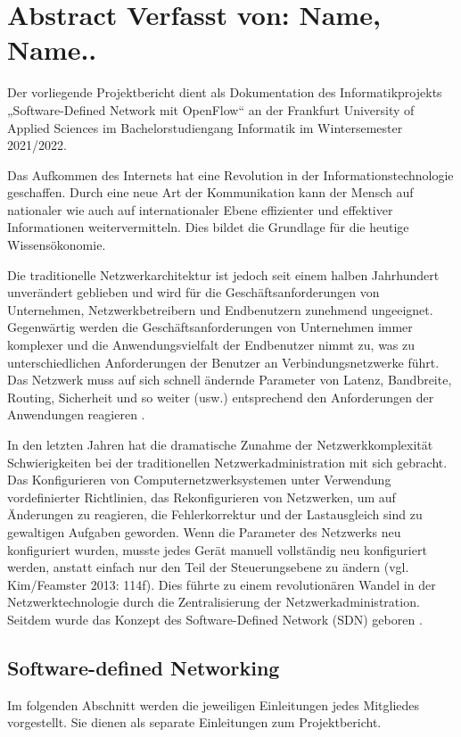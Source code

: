 \documentclass[fontsize=12pt,paper=a4,open=any,parskip=half,
  twoside=false,toc=listof,toc=bibliography,fleqn,leqno,
  captions=nooneline,captions=tableabove,british]{scrbook}
\begin{document}
\chapter{Abstract \tiny Verfasst von: Name, Name..}
Der vorliegende Projektbericht dient als Dokumentation des Informatikprojekts „Software-Defined Network mit OpenFlow“ an der Frankfurt University of Applied Sciences im Bachelorstudiengang Informatik im Wintersemester 2021/2022.\par
Das Aufkommen des Internets hat eine Revolution in der Informationstechnologie geschaffen. Durch eine neue Art der Kommunikation kann der Mensch auf nationaler wie auch auf internationaler Ebene effizienter und effektiver Informationen weitervermitteln. Dies bildet die Grundlage für die heutige Wissensökonomie.\par
Die traditionelle Netzwerkarchitektur ist jedoch seit einem halben Jahrhundert unverändert geblieben und wird für die Geschäftsanforderungen von Unternehmen, Netzwerkbetreibern und Endbenutzern zunehmend ungeeignet. Gegenwärtig werden die Geschäftsanforderungen von Unternehmen immer komplexer und die Anwendungsvielfalt der Endbenutzer nimmt zu, was zu unterschiedlichen Anforderungen der Benutzer an Verbindungsnetzwerke führt. Das Netzwerk muss auf sich schnell ändernde Parameter von Latenz, Bandbreite, Routing, Sicherheit und so weiter (usw.) entsprechend den Anforderungen der Anwendungen reagieren \cite{case}.\par
In den letzten Jahren hat die dramatische Zunahme der Netzwerkkomplexität Schwierigkeiten bei der traditionellen Netzwerkadministration mit sich gebracht. Das Konfigurieren von Computernetzwerksystemen unter Verwendung vordefinierter Richtlinien, das Rekonfigurieren von Netzwerken, um auf Änderungen zu reagieren, die Fehlerkorrektur und der Lastausgleich sind zu gewaltigen Aufgaben geworden. Wenn die Parameter des Netzwerks neu konfiguriert wurden, musste jedes Gerät manuell vollständig neu konfiguriert werden, anstatt einfach nur den Teil der Steuerungsebene zu ändern (vgl. Kim/Feamster 2013: 114f). Dies führte zu einem revolutionären Wandel in der Netzwerktechnologie durch die Zentralisierung der Netzwerkadministration. Seitdem wurde das Konzept des Software-Defined Network (SDN) geboren \cite[114-115]{improve}. 


\section{Software-defined Networking}\label{sdn}
Im folgenden Abschnitt werden die jeweiligen Einleitungen jedes Mitgliedes vorgestellt. Sie dienen als separate Einleitungen zum Projektbericht.
\end{document}
